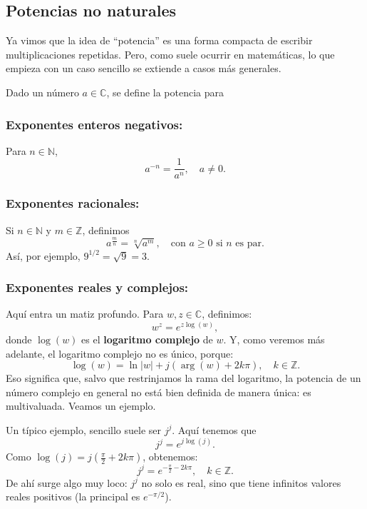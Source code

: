 \subsection{Potencias no naturales}

Ya vimos que la idea de ``potencia'' es una forma compacta de escribir multiplicaciones repetidas. Pero, como suele ocurrir en matemáticas, lo que empieza con un caso sencillo se extiende a casos más generales. 

Dado un número $a\in\mathbb{C}$, se define la potencia para

\subsubsection{Exponentes enteros negativos:}
Para \(n \in \mathbb{N}\),
\[
a^{-n} = \frac{1}{a^n}, \quad a \neq 0.
\]

\subsubsection{Exponentes racionales:}
Si \(n \in \mathbb{N}\) y \(m \in \mathbb{Z}\), definimos
\[
a^{\tfrac{m}{n}} = \sqrt[n]{a^m}, \quad \text{con } a \geq 0 \text{ si } n \text{ es par}.
\]
Así, por ejemplo, \(9^{1/2} = \sqrt{9} = 3\).

\subsubsection{Exponentes reales y complejos:}

Aquí entra un matiz profundo. Para \(w,z \in \mathbb{C}\), definimos:
\[
w^z = e^{z  \log(w)},
\]
donde \(\log(w)\) es el \textbf{logaritmo complejo} de \(w\). Y, como veremos más adelante, el logaritmo complejo no es único, porque:
\[
\log(w) = \ln|w| + j(\arg(w) + 2k\pi), \quad k \in \mathbb{Z}.
\]
Eso significa que, salvo que restrinjamos la rama del logaritmo, la potencia de un número complejo en general no está bien definida de manera única: es multivaluada. Veamos un ejemplo.

\begin{example}
  Un típico ejemplo, sencillo suele ser $j^j$. Aquí tenemos que
  \[
  j^j = e^{j \log(j)}.
  \]
  Como \(\log(j) = j\left(\tfrac{\pi}{2} + 2k\pi\right)\), obtenemos:
  \[
  j^j = e^{-\tfrac{\pi}{2} - 2k\pi}, \quad k \in \mathbb{Z}.
  \]
  De ahí surge algo muy loco: \(j^j\) no solo es real, sino que tiene infinitos valores reales positivos (la principal es \(e^{-\pi/2}\)).
\end{example}

